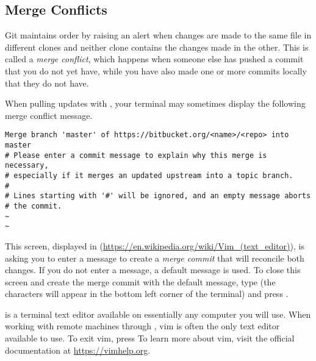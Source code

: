 \subsection*{Merge Conflicts} %
Git maintains order by raising an alert when changes are made to the same file in different clones and neither clone contains the changes made in the other.
This is called a \emph{merge conflict}, which happens when someone else  has pushed a commit that you do not yet have, while you have also made one or more commits locally that they do not have.

\begin{warn}
When pulling updates with , your terminal may sometimes display the following merge conflict message.
\begin{lstlisting}
Merge branch 'master' of https://bitbucket.org/<name>/<repo> into master
# Please enter a commit message to explain why this merge is necessary,
# especially if it merges an updated upstream into a topic branch.
#
# Lines starting with '#' will be ignored, and an empty message aborts
# the commit.
~
~
\end{lstlisting}

This screen, displayed in  (\url{https://en.wikipedia.org/wiki/Vim_(text_editor)}), is asking you to enter a message to create a \emph{merge commit} that will reconcile both changes.
If you do not enter a message, a default message is used.
To close this screen and create the merge commit with the default message, type  (the characters will appear in the bottom left corner of the terminal) and press .

\end{warn}

\begin{info}
 is a terminal text editor available on essentially any computer you will use.
When working with remote machines through , vim is often the only text editor available to use.
To exit vim, press 
To learn more about vim, visit the official documentation at \url{https://vimhelp.org}.
\end{info}

